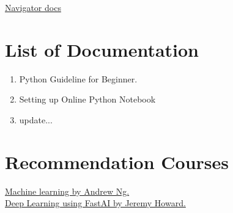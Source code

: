 \documentclass[a4paper,10pt]{article}
\begin{document}
\href{https://docs.anaconda.com/anaconda/navigator/}{Navigator docs}



\section{List of Documentation}

\begin{enumerate}
  \item Python Guideline for Beginner.
  \item Setting up Online Python Notebook
  \item update...
\end{enumerate}

\vspace{1cm}
\vspace{1cm}





\section{Recommendation Courses}

\href{https://www.coursera.org/learn/machine-learning}{Machine learning by Andrew Ng.}\\
\href{https://www.usfca.edu/data-institute/certificates/deep-learning-part-one}{Deep Learning using FastAI  by Jeremy Howard.}




\printbibliography
\end{document}
